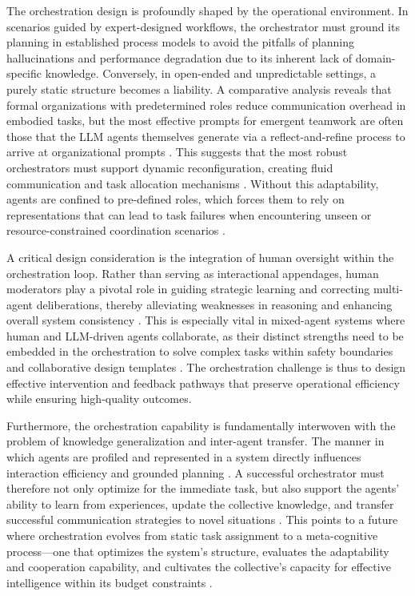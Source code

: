 \documentclass[11pt,a4paper]{article}
\begin{document}
The orchestration design is profoundly shaped by the operational environment. In scenarios guided by expert-designed workflows, the orchestrator must ground its planning in established process models to avoid the pitfalls of planning hallucinations and performance degradation due to its inherent lack of domain-specific knowledge. Conversely, in open-ended and unpredictable settings, a purely static structure becomes a liability. A comparative analysis reveals that formal organizations with predetermined roles reduce communication overhead in embodied tasks, but the most effective prompts for emergent teamwork are often those that the LLM agents themselves generate via a reflect-and-refine process to arrive at organizational prompts \cite{arxiv:2403.12482v1}. This suggests that the most robust orchestrators must support dynamic reconfiguration, creating fluid communication and task allocation mechanisms \cite{arxiv:2403.08282v2}. Without this adaptability, agents are confined to pre-defined roles, which forces them to rely on representations that can lead to task failures when encountering unseen or resource-constrained coordination scenarios \cite{arxiv:2403.12482v1,arxiv:2403.08282v2}.

A critical design consideration is the integration of human oversight within the orchestration loop. Rather than serving as interactional appendages, human moderators play a pivotal role in guiding strategic learning and correcting multi-agent deliberations, thereby alleviating weaknesses in reasoning and enhancing overall system consistency \cite{arxiv:2402.01108v1}. This is especially vital in mixed-agent systems where human and LLM-driven agents collaborate, as their distinct strengths need to be embedded in the orchestration to solve complex tasks within safety boundaries and collaborative design templates \cite{arxiv:2404.04834v1,arxiv:2403.07769v3,arxiv:2403.12482v1}. The orchestration challenge is thus to design effective intervention and feedback pathways that preserve operational efficiency while ensuring high-quality outcomes.

Furthermore, the orchestration capability is fundamentally interwoven with the problem of knowledge generalization and inter-agent transfer. The manner in which agents are profiled and represented in a system directly influences interaction efficiency and grounded planning \cite{arxiv:2402.02716v1}. A successful orchestrator must therefore not only optimize for the immediate task, but also support the agents' ability to learn from experiences, update the collective knowledge, and transfer successful communication strategies to novel situations \cite{arxiv:2307.02485v2}. This points to a future where orchestration evolves from static task assignment to a meta-cognitive process---one that optimizes the system's structure, evaluates the adaptability and cooperation capability, and cultivates the collective's capacity for effective intelligence within its budget constraints \cite{arxiv:2311.08562v2}.
\end{document}
